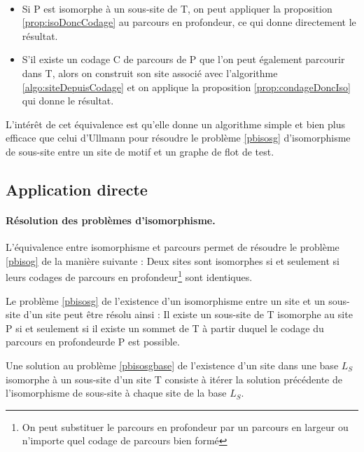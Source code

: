 \begin{pr}
~
 \begin{itemize}
  \item Si P est isomorphe à un sous-site de T, on peut appliquer la proposition \ref{prop:isoDoncCodage} au parcours en profondeur, ce qui donne directement le résultat.
  \item S'il existe un codage C de parcours de P que l'on peut également parcourir dans T, alors on construit son site associé avec l'algorithme \ref{algo:siteDepuisCodage} et on applique la proposition \ref{prop:condageDoncIso} qui donne le résultat.
 \end{itemize}
\end{pr}

L'intérêt de cet équivalence est qu'elle donne un algorithme simple et bien plus efficace que celui d'Ullmann pour résoudre le problème \ref{pbisosg} d'isomorphisme de sous-site entre un site de motif et un graphe de flot de test.

\subsection{Application directe}
\paragraph{Résolution des problèmes d'isomorphisme.}
L'équivalence entre isomorphisme et parcours permet de résoudre le problème \ref{pbisog} de la manière suivante :
Deux sites sont isomorphes si et seulement si leurs codages de parcours en profondeur\footnote{On peut substituer le parcours en profondeur par un parcours en largeur ou n'importe quel codage de parcours bien formé} sont identiques.

Le problème \ref{pbisosg} de l'existence d'un isomorphisme entre un site et un sous-site d'un site peut être résolu ainsi :
Il existe un sous-site de T isomorphe au site P si et seulement si il existe un sommet de T à partir duquel le codage du parcours en profondeur\footnotemark[\value{footnote}] de P est possible.

Une solution au problème \ref{pbisosgbase} de l'existence d'un site dans une base $L_S$ isomorphe à un sous-site d'un site T consiste à itérer la solution précédente de l'isomorphisme de sous-site à chaque site de la base $L_S$.

